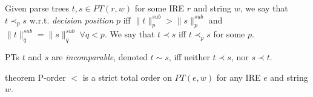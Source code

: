 \documentclass[AMA,STIX1COL]{WileyNJD-v2}
\newcommand{\PT}{PT}
\newcommand{\snorm}[2]{\|{#1}\|^{sub}_{#2}}
\begin{document}
    \begin{definition}
    \label{partial_order_on_PTs}
    Given parse trees $t, s \in PT(r, w)$ for some IRE $r$ and string $w$, we say that $t \prec_p s$ w.r.t. \emph{decision position} $p$ %
    iff $\snorm{t}{p} > \snorm{s}{p}$ and $\snorm{t}{q} = \snorm{s}{q} \; \forall q < p$.
    We say that $t \prec s$ iff $t \prec_p s$ for some $p$.
    \end{definition}

    \begin{definition}\label{incomparable_PTs}
    PTs $t$ and $s$ are \emph{incomparable}, denoted $t \sim s$,
    iff neither $t \prec s$, nor $s \prec t$.
    \end{definition}

\begin{theoremEnd}[restate, no link to proof, no link to theorem, category=theorem_porder_on_PTs]{theorem}
    \label{theorem_porder_on_PTs}
    P-order $<$ is a strict total order on $\PT(e, w)$ for any IRE $e$ and string $w$.
\end{theoremEnd}
\end{document}
